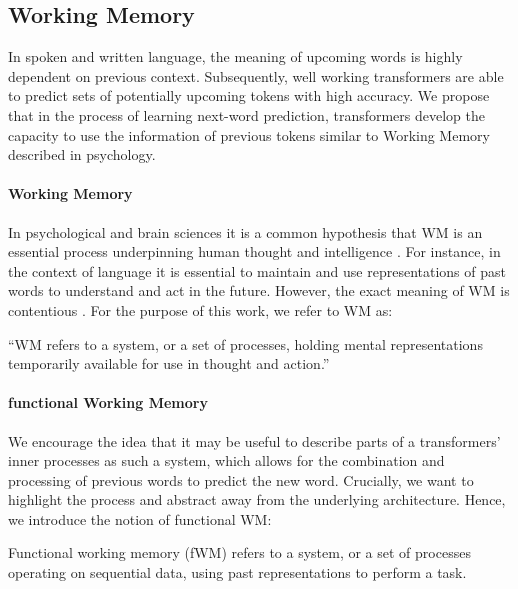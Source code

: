 \subsection{Working Memory}

In spoken and written language, the meaning of upcoming words is highly dependent on previous context.
Subsequently, well working transformers are able to predict sets of potentially upcoming tokens with high accuracy.
We propose that in the process of learning next-word prediction, transformers develop the capacity to use the information of previous tokens similar to  Working Memory described in psychology.

\paragraph{Working Memory} In psychological and brain sciences it is a common hypothesis that WM is an essential process underpinning human thought and intelligence \parencite{baddeley_working_2003}.
For instance, in the context of language it is essential to maintain and use representations of past words to understand and act in the future.
However, the exact meaning of WM is contentious \parencite{cowan_many_2017}. For the purpose of this work, we refer to WM as:

\begin{definition}
    ``WM refers to a system, or a set of processes, holding mental representations temporarily available for use in thought and action.'' \parencite{oberauer_benchmarks_2018}
\end{definition}

\paragraph{functional Working Memory} We encourage the idea that it may be useful to describe parts of a transformers' inner processes as such a system, which allows for the combination and processing of previous words to predict the new word.
Crucially, we want to highlight the process and abstract away from the underlying architecture. Hence, we introduce the notion of functional WM:

\begin{definition}
    Functional working memory (fWM) refers to a system, or a set of processes operating on sequential data, using past representations to perform a task.
\end{definition}

